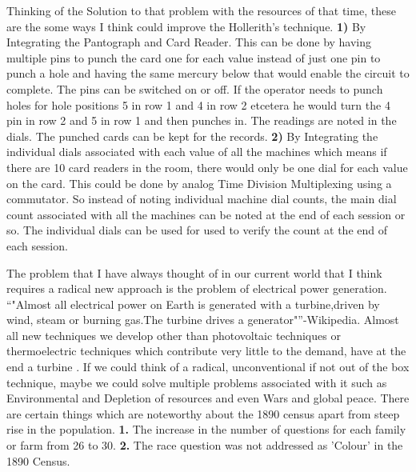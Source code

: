 \documentclass[fleqn,letterpaper,12pt]{report}
\begin{document}
\assignmenttitle

%
{}
\problem
Thinking of the Solution to that problem with the resources of that time, these are the some ways I think could improve the Hollerith’s technique.\newline
\textbf{1)} By Integrating the Pantograph and Card Reader. This can be done by having multiple pins to punch the card one for each value instead of just one pin to punch a hole and having the same mercury below that would enable the circuit to complete. The pins can be switched on or off. If the operator needs to punch holes for hole positions 5 in row 1 and 4 in row 2 etcetera he would turn the 4 pin in row 2 and 5 in row 1 and then punches in. The readings are noted in the dials. The punched cards can be kept for the records.\newline
\textbf{2)} By Integrating the individual dials associated with each value of all the machines which means if there are 10 card readers in the room, there would only be one dial for each value on the card. This could be done by analog Time Division Multiplexing using a commutator. So instead of noting individual machine dial counts, the main dial count associated with all the machines can be noted at the end of each session or so. The individual dials can be used for used to verify the count at the end of each session.\cite{Census}

The problem that I have always thought of in our current world that I think requires a radical new approach is the problem of electrical power generation. “"Almost all electrical power on Earth is generated with a turbine,driven by wind, steam or burning gas.The turbine drives a generator"”-Wikipedia.
Almost all new techniques we develop other than photovoltaic techniques or thermoelectric techniques which contribute very little to the demand, have at the end a turbine . If we could think of a radical, unconventional if not out of the box technique, maybe we could solve multiple problems associated with it such as Environmental and Depletion of resources and even Wars and global peace.\break
\newline
There are certain things which are noteworthy about the 1890 census apart from steep rise in the population.\newline
\textbf{1.} The increase in the number of questions for each family or farm from 26 to 30.\newline
\textbf{2.} The race question was not addressed as 'Colour' in the 1890 Census.
\end{document}

